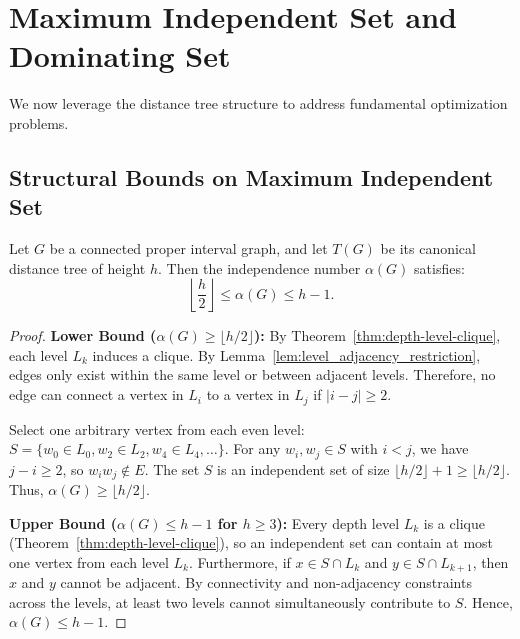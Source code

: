 \section{Maximum Independent Set and Dominating Set}
\label{sec:struct_mis_mds}

We now leverage the distance tree structure to address fundamental optimization problems.

\subsection{Structural Bounds on Maximum Independent Set}

\begin{lemma}
\label{lem:independent-set-height-bounds}
Let $G$ be a connected proper interval graph, and let $T(G)$ be its canonical distance tree of height $h$. Then the independence number $\alpha(G)$ satisfies:
\begin{equation}
    \left\lfloor \frac{h}{2} \right\rfloor \le \alpha(G) \le h - 1.
\end{equation}
\end{lemma}
\begin{proof}
\textbf{Lower Bound ($\alpha(G) \ge \lfloor h/2 \rfloor$):}
By Theorem~\ref{thm:depth-level-clique}, each level $L_k$ induces a clique. By Lemma~\ref{lem:level_adjacency_restriction}, edges only exist within the same level or between adjacent levels. Therefore, no edge can connect a vertex in $L_i$ to a vertex in $L_j$ if $|i - j| \ge 2$. 

Select one arbitrary vertex from each even level: $S = \{w_0 \in L_0, w_2 \in L_2, w_4 \in L_4, \dots\}$. For any $w_i, w_j \in S$ with $i < j$, we have $j - i \ge 2$, so $w_i w_j \notin E$. The set $S$ is an independent set of size $\lfloor h/2 \rfloor + 1 \ge \lfloor h/2 \rfloor$. Thus, $\alpha(G) \ge \lfloor h/2 \rfloor$.

\textbf{Upper Bound ($\alpha(G) \le h - 1$ for $h \ge 3$):}
Every depth level $L_k$ is a clique (Theorem~\ref{thm:depth-level-clique}), so an independent set can contain at most one vertex from each level $L_k$. Furthermore, if $x \in S \cap L_k$ and $y \in S \cap L_{k+1}$, then $x$ and $y$ cannot be adjacent. By connectivity and non-adjacency constraints across the levels, at least two levels cannot simultaneously contribute to $S$. Hence, $\alpha(G) \le h - 1$.
\end{proof}

